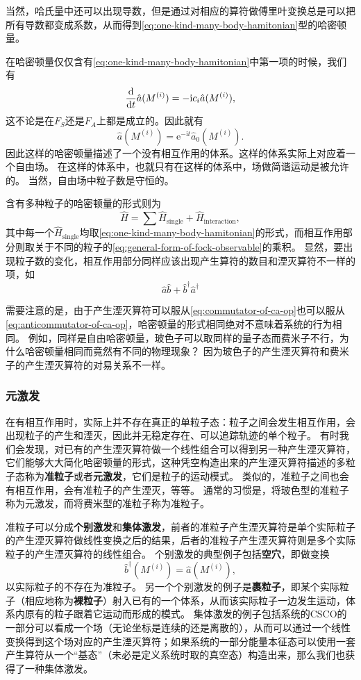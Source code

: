 \documentclass[UTF8, a4paper]{ctexart}
\newcommand*{\ii}{\mathrm{i}}
\newcommand*{\ee}{\mathrm{e}}
\begin{document}
当然，哈氏量中还可以出现导数，但是通过对相应的算符做傅里叶变换总是可以把所有导数都变成系数，从而得到\eqref{eq:one-kind-many-body-hamitonian}型的哈密顿量。

在哈密顿量仅仅含有\eqref{eq:one-kind-many-body-hamitonian}中第一项的时候，我们有
\[
    \dv{t} \hat{a}(M^{(i)}) = - \ii c_i \hat{a} (M^{(i)}),
\]
这不论是在$F_S$还是$F_A$上都是成立的。因此就有
\[
    \hat{a} (M^{(i)}) = \ee^{- \ii t} \hat{a}_0 (M^{(i)}).
\]
因此这样的哈密顿量描述了一个没有相互作用的体系。这样的体系实际上对应着一个自由场。
在这样的体系中，也就只有在这样的体系中，场做简谐运动是被允许的。
当然，自由场中粒子数是守恒的。

含有多种粒子的哈密顿量的形式则为
\begin{equation}
    \hat{H} = \sum \hat{H}_\text{single} + \hat{H}_\text{interaction},
\end{equation}
其中每一个$\hat{H}_\text{single}$均取\eqref{eq:one-kind-many-body-hamitonian}的形式，而相互作用部分则取关于不同的粒子的\eqref{eq:general-form-of-fock-observable}的乘积。
显然，要出现粒子数的变化，相互作用部分同样应该出现产生算符的数目和湮灭算符不一样的项，如
\[
    \hat{a} \hat{b} + \hat{b}^\dagger \hat{a}^\dagger
\]

需要注意的是，由于产生湮灭算符可以服从\eqref{eq:commutator-of-ca-op}也可以服从\eqref{eq:anticommutator-of-ca-op}，哈密顿量的形式相同绝对不意味着系统的行为相同。
例如，同样是自由哈密顿量，玻色子可以取同样的量子态而费米子不行，为什么哈密顿量相同而竟然有不同的物理现象？
因为玻色子的产生湮灭算符和费米子的产生湮灭算符的对易关系不一样。

\subsubsection{元激发}

在有相互作用时，实际上并不存在真正的单粒子态：粒子之间会发生相互作用，会出现粒子的产生和湮灭，因此并无稳定存在、可以追踪轨迹的单个粒子。
有时我们会发现，对已有的产生湮灭算符做一个线性组合可以得到另一种产生湮灭算符，它们能够大大简化哈密顿量的形式，这种凭空构造出来的产生湮灭算符描述的多粒子态称为\textbf{准粒子}或者\textbf{元激发}，它们是粒子的运动模式。
类似的，准粒子之间也会有相互作用，会有准粒子的产生湮灭，等等。
通常的习惯是，将玻色型的准粒子称为元激发，而将费米型的准粒子称为准粒子。

准粒子可以分成\textbf{个别激发}和\textbf{集体激发}，前者的准粒子产生湮灭算符是单个实际粒子的产生湮灭算符做线性变换之后的结果，后者的准粒子产生湮灭算符则是多个实际粒子的产生湮灭算符的线性组合。
个别激发的典型例子包括\textbf{空穴}，即做变换
\[
    \hat{b}^\dagger(M^{(i)}) = \hat{a}(M^{(i)}),
\]
以实际粒子的不存在为准粒子。
另一个个别激发的例子是\textbf{裹粒子}，即某个实际粒子（相应地称为\textbf{裸粒子}）射入已有的一个体系，从而该实际粒子一边发生运动，体系内原有的粒子跟着它运动而形成的模式。
集体激发的例子包括系统的CSCO的一部分可以看成一个场（无论坐标是连续的还是离散的），从而可以通过一个线性变换得到这个场对应的产生湮灭算符；如果系统的一部分能量本征态可以使用一套产生算符从一个“基态”（未必是定义系统时取的真空态）构造出来，那么我们也获得了一种集体激发。
\end{document}

